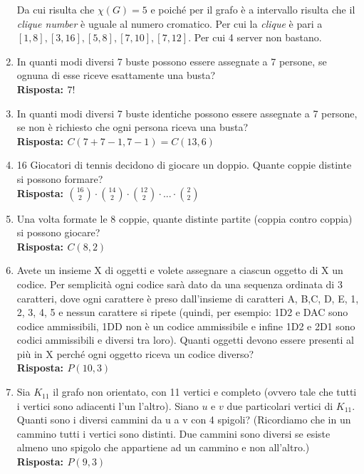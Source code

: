 \documentclass[10pt,a4paper,titlepage]{article}
\theoremstyle{break}
\theoremstyle{break}
\theoremstyle{break}
\begin{document}
\begin{enumerate}

Da cui risulta che $\chi(G) = 5$ e poiché per il grafo è a intervallo risulta che il \textit{clique number} è uguale al numero cromatico. Per cui la \textit{clique} è pari a $[1, 8], [3, 16], [5, 8], [7, 10], [7, 12]$. Per cui 4 server non bastano.

\item In quanti modi diversi 7 buste possono essere assegnate a 7 persone, se ognuna di esse riceve esattamente
una busta? \\
\textbf{Risposta: $7!$}

\item In quanti modi diversi 7 buste identiche possono essere assegnate a 7 persone, se non è richiesto che
ogni persona riceva una busta? \\
\textbf{Risposta: $C(7+7-1, 7-1)=C(13,6)$}


\item 16 Giocatori di tennis decidono di giocare un doppio. Quante coppie distinte si possono formare? \\
\textbf{Risposta: $\binom{16}{2}\cdot\binom{14}{2}\cdot\binom{12}{2}\cdot...\cdot\binom{2}{2}$}

\item  Una volta formate le 8 coppie, quante distinte partite (coppia contro coppia) si possono giocare? \\
\textbf{Risposta: $C(8,2)$}

\item Avete un insieme X di oggetti e volete assegnare a ciascun oggetto di X un codice. Per semplicità ogni
codice sarà dato da una sequenza ordinata di 3 caratteri, dove ogni carattere è preso dall'insieme di caratteri
{A, B,C, D, E, 1, 2, 3, 4, 5} e nessun carattere si ripete (quindi, per esempio: 1D2 e DAC sono codice ammissibili, 1DD non è un codice ammissibile e infine 1D2 e 2D1 sono codici ammissibili e diversi tra loro).
Quanti oggetti devono essere presenti al più in X perché ogni oggetto riceva un codice diverso? \\
\textbf{Risposta: $P(10,3)$}

\item Sia $K_{11}$ il grafo non orientato, con 11 vertici e completo (ovvero tale che tutti i vertici sono adiacenti l'un
l'altro). Siano $u$ e $v$ due particolari vertici di $K_{11}$. Quanti sono i diversi cammini da u a v con 4 spigoli?
(Ricordiamo che in un cammino tutti i vertici sono distinti. Due cammini sono diversi se esiste almeno uno
spigolo che appartiene ad un cammino e non all'altro.) \\
\textbf{Risposta: $P(9,3)$}


\end{enumerate}
\end{document}
